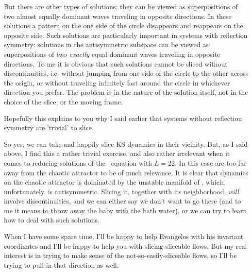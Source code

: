 \begin{description}
    But there are other types of solutions: they can be viewed as superpositions of two almost equally dominant waves traveling in opposite directions.  In these solutions a pattern on the one side of the circle disappears and reappears on the opposite side.  Such solutions are particularly important in systems with reflection symmetry: solutions in the antisymmetric subspace can be viewed as superpositions of two {\em exactly} equal dominant waves traveling in opposite directions.  To me it is obvious that such solutions cannot be sliced without discontinuities, i.e. without jumping from one side of the circle to the other across the origin, or without traveling infinitely fast around the circle in whichever direction you prefer.  The problem is in the nature of the solution itself, not in the choice of the slice, or the moving frame.

    Hopefully this explains to you why I said earlier that systems without reflection symmetry are 'trivial' to slice.

    So yes, we can take  and happily slice KS dynamics in their vicinity.  But, as I said above, I find this a rather trivial exercise, and also rather irrelevant when it comes to reducing solutions of the \KS\ equation with $L = 22$.  In this case  are too far away from the chaotic attractor to be of much relevance.  It is clear that dynamics on the chaotic attractor is dominated by the unstable manifold of , which, unfortunately, is antisymmetric.  Slicing it, together with its neighborhood, {\em will} involve discontinuities, and we can either say we don't want to go there (and to me it means to throw away the baby with the bath water), or we can try to learn how to deal with such solutions.

    When I have some spare time, I'll be happy to help Evangelos with his invariant coordinates and I'll be happy to help you with slicing sliceable flows.  But my real interest is in trying to make sense of the not-so-easily-sliceable flows, so I'll be trying to pull in that direction as well.  

\end{description}

\renewcommand{\ssp}{a}
